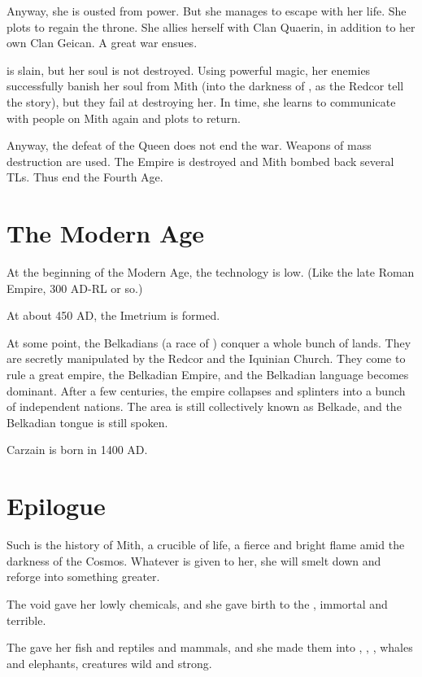 Anyway, she is ousted from power. But she manages to escape with her life. She plots to regain the throne. She allies herself with Clan Quaerin, in addition to her own Clan Geican. A great war ensues. 

\Belzir{} is slain, but her soul is not destroyed. Using powerful magic, her enemies successfully banish her soul from Mith (into the darkness of \nieur{}, as the Redcor tell the story), but they fail at destroying her. In time, she learns to communicate with people on Mith again and plots to return. 

Anyway, the defeat of the Queen does not end the war. Weapons of mass destruction are used. The Empire is destroyed and Mith bombed back several TLs. Thus end the Fourth Age. 



\section{The Modern Age}
At the beginning of the Modern Age, the technology is low. (Like the late Roman Empire, 300 AD-RL or so.) 

At about 450 AD, the Imetrium is formed. 

At some point, the Belkadians (a race of \humans{}) conquer a whole bunch of lands. They are secretly manipulated by the Redcor and the Iquinian Church. They come to rule a great empire, the Belkadian Empire, and the Belkadian language becomes dominant. After a few centuries, the empire collapses and splinters into a bunch of independent nations. The area is still collectively known as Belkade, and the Belkadian tongue is still spoken. 

Carzain is born in 1400 AD. 



\section{Epilogue}
Such is the history of Mith, a crucible of life, a fierce and bright flame amid the darkness of the Cosmos. Whatever is given to her, she will smelt down and reforge into something greater. 

The void gave her lowly chemicals, and she gave birth to the \krakens{}, immortal and terrible. 

The \voyagers{} gave her fish and reptiles and mammals, and she made them into \caderyns, \nycans{}, \cortios{}, whales and elephants, creatures wild and strong. 

